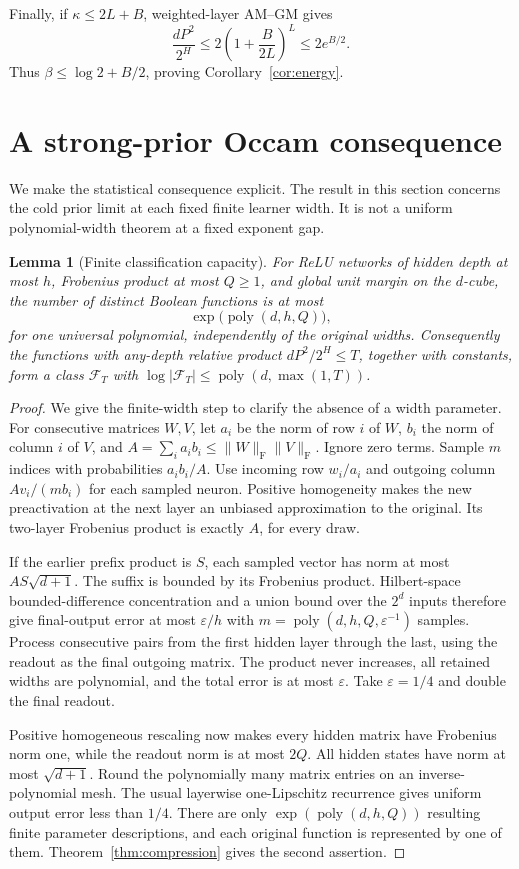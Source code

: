 \documentclass[11pt]{article}
\newtheorem{lemma}[theorem]{Lemma}
\theoremstyle{remark}\newtheorem{remark}[theorem]{Remark}
\newcommand{\F}{\mathrm F}
\begin{document}
Finally, if $\kappa\le2L+B$, weighted-layer AM--GM gives
\[
 \frac{dP^2}{2^H}\le2\left(1+\frac B{2L}\right)^L\le2e^{B/2}.
\]
Thus $\beta\le\log2+B/2$, proving Corollary~\ref{cor:energy}.

\section{A strong-prior Occam consequence}
We make the statistical consequence explicit. The result in this section
concerns the cold prior limit at each fixed finite learner width. It is
not a uniform polynomial-width theorem at a fixed exponent gap.

\begin{lemma}[Finite classification capacity]\label{lem:capacity}
For ReLU networks of hidden depth at most $h$, Frobenius product at most
$Q\ge1$, and global unit margin on the $d$-cube, the number of distinct
Boolean functions is at most
\[
 \exp\bigl(\operatorname{poly}(d,h,Q)\bigr),
\]
for one universal polynomial, independently of the original widths.
Consequently the functions with any-depth relative product
$dP^2/2^H\le T$, together with constants, form a class $\mathcal F_T$ with
$\log|\mathcal F_T|\le\operatorname{poly}(d,\max(1,T))$.
\end{lemma}
\begin{proof}
We give the finite-width step to clarify the absence of a width parameter.
For consecutive matrices $W,V$, let $a_i$ be the norm of row $i$ of $W$,
$b_i$ the norm of column $i$ of $V$, and
$A=\sum_i a_i b_i\le\|W\|_\F\|V\|_\F$.
Ignore zero terms. Sample $m$ indices with probabilities $a_i b_i/A$.
Use incoming row $w_i/a_i$ and outgoing column $Av_i/(mb_i)$ for each
sampled neuron. Positive homogeneity makes the new preactivation at the
next layer an unbiased approximation to the original. Its two-layer
Frobenius product is exactly $A$, for every draw.

If the earlier prefix product is $S$, each sampled vector has norm at
most $AS\sqrt{d+1}$. The suffix is bounded by its Frobenius product.
Hilbert-space bounded-difference concentration and a union bound over the
$2^d$ inputs therefore give final-output error at most $\varepsilon/h$
with
$m=\operatorname{poly}(d,h,Q,\varepsilon^{-1})$ samples.
Process consecutive pairs from the first hidden layer through the last,
using the readout as the final outgoing matrix. The product never
increases, all retained widths are polynomial, and the total error is at
most $\varepsilon$. Take $\varepsilon=1/4$ and double the final readout.

Positive homogeneous rescaling now makes every hidden matrix have
Frobenius norm one, while the readout norm is at most $2Q$.
All hidden states have norm at most $\sqrt{d+1}$. Round the polynomially
many matrix entries on an inverse-polynomial mesh. The usual layerwise
one-Lipschitz recurrence gives uniform output error less than $1/4$.
There are only $\exp(\operatorname{poly}(d,h,Q))$ resulting finite
parameter descriptions, and each original function is represented by one
of them. Theorem~\ref{thm:compression} gives the second assertion.
\end{proof}
\end{document}
